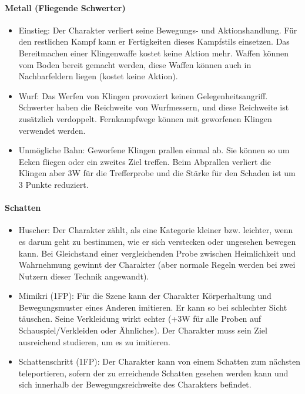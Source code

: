 \documentclass{article}
\begin{document}
\paragraph{Metall (Fliegende Schwerter)}

\begin{itemize}
\item Einstieg: Der Charakter verliert seine Bewegungs- und Aktionshandlung. Für den restlichen Kampf kann er Fertigkeiten dieses Kampfstils einsetzen. Das Bereitmachen einer Klingenwaffe kostet keine Aktion mehr. Waffen können vom Boden bereit gemacht werden, diese Waffen können auch in Nachbarfeldern liegen (kostet keine Aktion).
\item Wurf: Das Werfen von Klingen provoziert keinen Gelegenheitsangriff. Schwerter haben die Reichweite von Wurfmessern, und diese Reichweite ist zusätzlich verdoppelt. Fernkampfwege können mit geworfenen Klingen verwendet werden.
\item Unmögliche Bahn: Geworfene Klingen prallen einmal ab. Sie können so um Ecken fliegen oder ein zweites Ziel treffen. Beim Abprallen verliert die Klingen aber 3W für die Trefferprobe und die Stärke für den Schaden ist um 3 Punkte reduziert.
\end{itemize}

\paragraph{Schatten}

\begin{itemize}
\item Huscher: Der Charakter zählt, als eine Kategorie kleiner bzw. leichter, wenn es darum geht zu bestimmen, wie er sich verstecken oder ungesehen bewegen kann. Bei Gleichstand einer vergleichenden Probe zwischen Heimlichkeit und Wahrnehmung gewinnt der Charakter (aber normale Regeln werden bei zwei Nutzern dieser Technik angewandt).
\item Mimikri (1FP): Für die Szene kann der Charakter Körperhaltung und Bewegungsmuster eines Anderen imitieren. Er kann so bei schlechter Sicht täuschen. Seine Verkleidung wirkt echter (+3W für alle Proben auf Schauspiel/Verkleiden oder Ähnliches). Der Charakter muss sein Ziel ausreichend studieren, um es zu imitieren.
\item Schattenschritt (1FP): Der Charakter kann von einem Schatten zum nächsten teleportieren, sofern der zu erreichende Schatten gesehen werden kann und sich innerhalb der Bewegungsreichweite des Charakters befindet.
\end{itemize}
\end{document}
